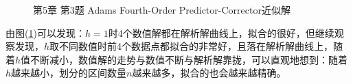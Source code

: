 \documentclass[12pt]{ctexart}
\begin{document}
\begin{figure}[htbp]
{		} \quad
		 \quad
		\caption{第5章 第3题 Adams Fourth-Order Predictor-Corrector近似解}\label{e5_3}
	\end{figure}
	
	由图(\ref{e5_3})可以发现：$h=1$时4个数值解都在解析解曲线上，拟合的很好，但继续观察发现，$h$取不同数值时前4个数据点都拟合的非常好，且落在解析解曲线上，随着$h$值不断减小，数值解的走势与数值不断与解析解靠拢，可以直观地想到：随着$h$越来越小，划分的区间数量$n$越来越多，拟合的也会越来越精确。
	
\end{document}
